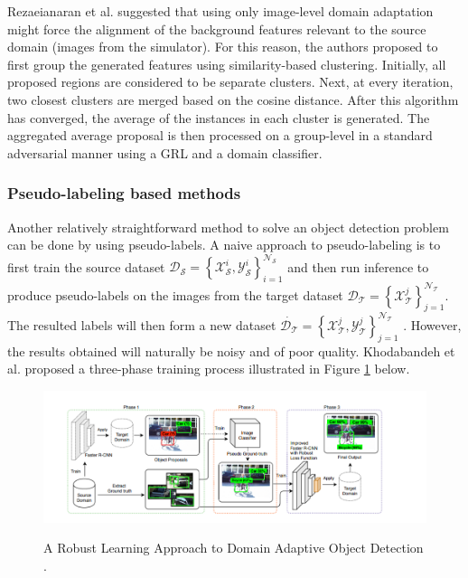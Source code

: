 Rezaeianaran et al. suggested that using only image-level domain adaptation might force the alignment of the background features relevant to the source domain (images from the simulator). For this reason, the authors proposed to first group the generated features using similarity-based clustering. Initially, all proposed regions are considered to be separate clusters. Next, at every  iteration, two closest clusters are merged based on the cosine distance. After this algorithm has converged, the average of the instances in each cluster is generated. The aggregated average proposal is then processed on a group-level in a standard adversarial manner using a GRL and a domain classifier. 
\FloatBarrier

\subsubsection{Pseudo-labeling based methods}

Another relatively straightforward method to solve an object detection problem can be done by using pseudo-labels. A naive approach to pseudo-labeling is to first train the source dataset $\mathcal{D}_{\mathcal{S}}=\left\{\mathcal{X}_{\mathcal{S}}^{i}, \mathcal{Y}_{\mathcal{S}}^{i}\right\}_{i=1}^{\mathcal{N}_{\mathcal{S}}}$ and then run inference to produce pseudo-labels on the images from the target dataset $\mathcal{D}_{\mathcal{T}}=\left\{\mathcal{X}_{\mathcal{T}}^{j}\right\}_{j=1}^{\mathcal{N}_{\mathcal{T}}}$. The resulted labels will then form a new dataset $\dot{\mathcal{D}_{\mathcal{T}}}=\left\{\mathcal{X}_{\mathcal{T}}^{j}, \mathcal{Y}_{\mathcal{T}}^{j}\right\}_{j=1}^{\mathcal{N}_{\mathcal{T}}}$ \cite{Oza2021}. However, the results obtained will naturally be noisy and of poor quality. Khodabandeh et al. proposed a three-phase training process illustrated in Figure \ref{robust} below. 

\begin{figure}[htb]
	\begin{center}
		\includegraphics[width=16cm]{./robust.png}
	\end{center}
	\caption{A Robust Learning Approach to Domain Adaptive Object Detection \cite{Khodabandeh2019}.}
	\begin{center}
		\label{robust}
	\end{center}
\end{figure}

